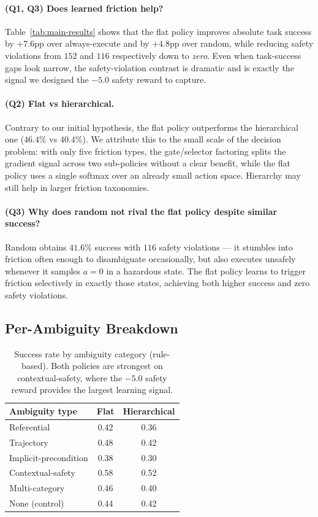 \paragraph{(Q1, Q3) Does learned friction help?}
Table~\ref{tab:main-results} shows that the flat policy improves absolute task success by $+7.6$pp over always-execute and by $+4.8$pp over random, while reducing safety violations from $152$ and $116$ respectively down to \emph{zero}. Even when task-success gaps look narrow, the safety-violation contrast is dramatic and is exactly the signal we designed the $-5.0$ safety reward to capture.

\paragraph{(Q2) Flat vs hierarchical.}
Contrary to our initial hypothesis, the flat policy outperforms the hierarchical one ($46.4\%$ vs $40.4\%$). We attribute this to the small scale of the decision problem: with only five friction types, the gate/selector factoring splits the gradient signal across two sub-policies without a clear benefit, while the flat policy uses a single softmax over an already small action space. Hierarchy may still help in larger friction taxonomies.

\paragraph{(Q3) Why does random not rival the flat policy despite similar success?}
Random obtains $41.6\%$ success with $116$ safety violations --- it stumbles into friction often enough to disambiguate occasionally, but also executes unsafely whenever it samples $a=0$ in a hazardous state. The flat policy learns to trigger friction selectively in exactly those states, achieving both higher success and zero safety violations.

\subsection{Per-Ambiguity Breakdown}

\begin{table}[t]
\centering
\small
\begin{tabular}{lcc}
\toprule
\textbf{Ambiguity type} & \textbf{Flat} & \textbf{Hierarchical} \\
\midrule
Referential & 0.42 & 0.36 \\
Trajectory & 0.48 & 0.42 \\
Implicit-precondition & 0.38 & 0.30 \\
Contextual-safety & 0.58 & 0.52 \\
Multi-category & 0.46 & 0.40 \\
None (control) & 0.44 & 0.42 \\
\bottomrule
\end{tabular}
\caption{Success rate by ambiguity category (rule-based). Both policies are strongest on contextual-safety, where the $-5.0$ safety reward provides the largest learning signal.}
\label{tab:per-ambiguity}
\end{table}

